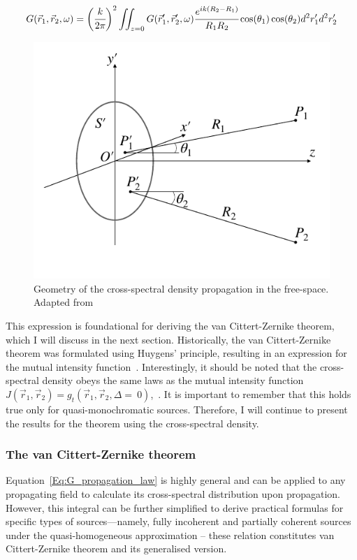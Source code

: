     \begin{align}
        G(\vec{r}_1, \vec{r}_2, \omega) = \bigg(\cfrac{k}{ 2 \pi} \bigg)^2 \iint_{z=0} G(\vec{r}'_1, \vec{r}'_2, \omega) \cfrac{e^{i k (R_2 - R_1)}}{R_1 R_2} \cos(\theta_1) \cos(\theta_2) d^2r'_1 d^2r'_2
        \label{Eq:G_propagation_law}
    \end{align}
    \begin{figure}
        \centering
        \includegraphics[width=0.95\linewidth]{content/images/Statistical_Optics/coh_prop_scheme.pdf}
        \captionsetup{justification=centering}
        \caption{Geometry of the cross-spectral density propagation in the free-space. Adapted from~}
        \label{Fig:coh_prop_scheme}
    \end{figure}
    This expression is foundational for deriving the van Cittert-Zernike theorem, which I will discuss in the next section. Historically, the van Cittert-Zernike theorem was formulated using Huygens' principle, resulting in an expression for the mutual intensity function~\cite{van_cittert_wahrscheinliche_1934, zernike_concept_1938}.
    Interestingly, it should be noted that the cross-spectral density obeys the same laws as the mutual intensity function $J(\vec{r}_1, \vec{r}_2) = g_t(\vec{r}_1, \vec{r}_2, \Delta =~0)$,~\cite{goodman_statistical_2015, mandel_wolf}. It is important to remember that this holds true only for quasi-monochromatic sources. Therefore, I will continue to present the results for the theorem using the cross-spectral density.

\subsubsection{The van Cittert-Zernike theorem}
    Equation~\ref{Eq:G_propagation_law} is highly general and can be applied to any propagating field to calculate its cross-spectral distribution upon propagation. However, this integral can be further simplified to derive practical formulas for specific types of sources—namely, fully incoherent and partially coherent sources under the quasi-homogeneous approximation -- these relation constitutes van Cittert-Zernike theorem and its generalised version. 
    
